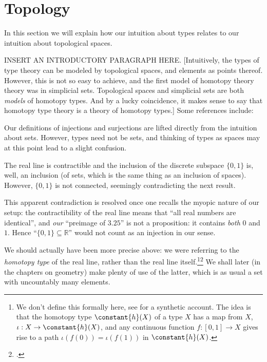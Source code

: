 \section{Topology}
\label{sec:topology}
In this section we will explain how our intuition about types relates to our intuition about topological spaces.

INSERT AN INTRODUCTORY PARAGRAPH HERE.
[Intuitively, the types of type theory can be modeled by topological spaces,
and elements as points thereof. However, this is not so easy to achieve, and the first
model of homotopy theory theory was in simplicial sets. Topological spaces and simplicial sets are both \emph{models} of homotopy types. And by a lucky coincidence, it makes sense
to say that homotopy type theory is a theory of homotopy types.]
Some references include: \textcite{Hatcher-AlgTop,May-Concise,MayPonto-MoreConcise}

\begin{remark}
  \label{rem:injectionsurjectionisnotwhatyouthink}
  Our definitions of injections and surjections are lifted directly from the intuition about sets.  However, types need not be sets, and
  thinking of types as spaces may at this point lead to a slight confusion.

  The real line is contractible and the inclusion of the discrete subspace $\{0,1\}$ is, well, an inclusion (of sets, which is the same thing as
  an inclusion of spaces).  However, $\{0,1\}$ is not connected, seemingly contradicting the next result.

  This apparent contradiction is resolved once one recalls the myopic nature of our setup: the contractibility of the real line means that ``all
  real numbers are identical'', and \emph{our} ``preimage of $3{.}25$'' is not a proposition: it contains \emph{both} $0$ and $1$.  Hence
  ``$\{0,1\}\subseteq\mathbb R$'' would not count as an injection in our sense.

  We should actually have been more precise above: we were referring to the \emph{homotopy type} of the real line, rather than the real line itself.\footnote{\label{ft:cohesive}%
    We don't define this formally here,
    see \citeauthor{Shulman-Real-Cohesive}\footnotemark{} for a synthetic account.
    The idea is that the homotopy type $\constant{h}(X)$ of a type $X$
    has a map from $X$, $\iota : X \to \constant{h}(X)$,
    and any continuous function $f : [0,1] \to X$
    gives rise to a path
    $\iota(f(0)) = \iota(f(1))$ in
    $\constant{h}(X)$.}\footcitetext{Shulman-Real-Cohesive}
  We shall later (in the chapters on geometry) make plenty of use of the latter,
  which is as usual a set with uncountably many elements.
\end{remark}




